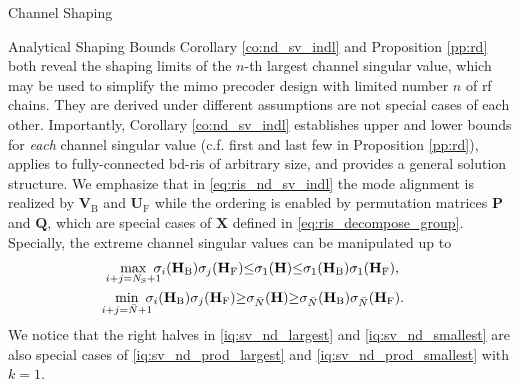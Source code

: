 \documentclass[journal]{IEEEtran}
\begin{document}
\begin{section}{Channel Shaping}
\begin{subsection}{Analytical Shaping Bounds}
		Corollary \ref{co:nd_sv_indl} and Proposition \ref{pp:rd} both reveal the shaping limits of the $n$-th largest channel singular value, which may be used to simplify the \gls{mimo} precoder design with limited number $n$ of \gls{rf} chains.
		They are derived under different assumptions are not special cases of each other.
		Importantly, Corollary \ref{co:nd_sv_indl} establishes upper and lower bounds for \emph{each} channel singular value (c.f. first and last few in Proposition \ref{pp:rd}), applies to fully-connected \gls{bd}-\gls{ris} of arbitrary size, and provides a general solution structure.
		We emphasize that in \eqref{eq:ris_nd_sv_indl} the mode alignment is realized by $\mathbf{V}_\mathrm{B}$ and $\mathbf{U}_\mathrm{F}$ while the ordering is enabled by permutation matrices $\mathbf{P}$ and $\mathbf{Q}$, which are special cases of $\mathbf{X}$ defined in \eqref{eq:ris_decompose_group}.
		Specially, the extreme channel singular values can be manipulated up to
		\begin{subequations}
			\label{iq:sv_nd_extreme}
			\begin{gather}
				\max_{\mathclap{i+j=N_\mathrm{S}+1}} \ \sigma_i(\mathbf{H}_\mathrm{B}) \sigma_j(\mathbf{H}_\mathrm{F}) {\le} \sigma_1(\mathbf{H}) {\le} \sigma_1(\mathbf{H}_\mathrm{B}) \sigma_1(\mathbf{H}_\mathrm{F}), \label{iq:sv_nd_largest} \\
				\min_{\mathclap{i+j=\bar{N}+1}} \ \sigma_i(\mathbf{H}_\mathrm{B}) \sigma_j(\mathbf{H}_\mathrm{F}) {\ge} \sigma_{\bar{N}}(\mathbf{H}) {\ge} \sigma_{\bar{N}}(\mathbf{H}_\mathrm{B}) \sigma_{\bar{N}}(\mathbf{H}_\mathrm{F}). \label{iq:sv_nd_smallest}
			\end{gather}
		\end{subequations}
		We notice that the right halves in \eqref{iq:sv_nd_largest} and \eqref{iq:sv_nd_smallest} are also special cases of \eqref{iq:sv_nd_prod_largest} and \eqref{iq:sv_nd_prod_smallest} with $k=1$.


\end{subsection}
\end{section}
\end{document}
